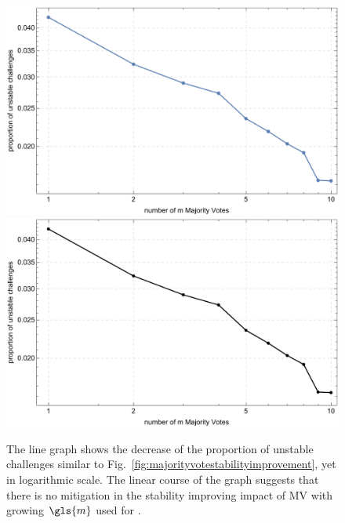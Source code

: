 \begin{figure}[htp] %
\ifx{}\undefined
{}
\else
	\if{}
\centering
\includegraphics[width=1.00\textwidth]{images/single-votes-stab-simulation_loglog.pdf}
	\else
\includegraphics[width=1.00\textwidth]{images/single-votes-stab-simulation_loglog_mono.pdf}
    \fi
\fi
\caption[Decrease of unstable challenges of a \mpuf logarithmic]{The line graph shows the decrease of the proportion of unstable challenges similar to Fig.\ \ref{fig:majorityvotestabilityimprovement}, yet in logarithmic scale. The  linear course of the graph suggests that there is no mitigation in the stability improving impact of \ac{MV} with growing $\gls{m}$ used for \mpufs.} 
\label{fig:majorityvotestabilityimprovementloglog}
\end{figure}

